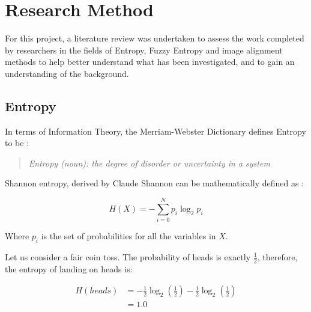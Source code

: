 \section{Research Method}


For this project, a literature review was undertaken to assess the work completed by researchers in the fields of Entropy, Fuzzy Entropy and image alignment methods to help better understand what has been investigated, and to gain an understanding of the background.

\subsection{Entropy}
\label{ssec:entropy}

In terms of Information Theory, the Merriam-Webster Dictionary defines Entropy to be \cite{def_entropy}:

\begin{quotation}
 \textit{Entropy (noun): the degree of disorder or uncertainty in a system}
\end{quotation}

Shannon entropy, derived by Claude Shannon \cite{shannon1948a} can be mathematically defined as :

\begin{equation}
  H(X) = - \displaystyle\sum_{i=0}^{N}{p_i \log_2 p_i}
\end{equation}

Where $p_i$ is the set of probabilities for all the variables in $X$.

Let us consider a fair coin toss. The probability of heads is exactly $\frac{1}{2}$, therefore, the entropy of landing on heads is:

\begin{equation}
  \begin{split}
    H(heads) &= -\frac{1}{2}\log_2(\frac{1}{2}) - \frac{1}{2}\log_2(\frac{1}{2}) \\
    &= 1.0
  \end{split}
\end{equation}

